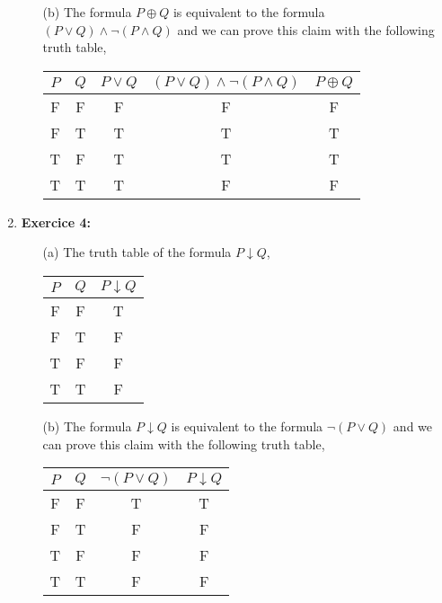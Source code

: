 \documentclass{article} %
\begin{document}
\begin{enumerate}
\begin{itemize}
        \item[(b)] The formula $P \oplus Q$ is equivalent to the formula $(P \lor Q) \land \neg (P \land Q)$ and we can prove this claim with the following truth table,
        \begin{center}
        \begin{tabular}{ccccc}
            $P$ & $Q$ & $P \lor Q$ & $(P \lor Q) \land \neg(P \land Q)$ & $P \oplus Q$ \\
            \hline
            F & F & F & F & F \\
            F & T & T & T & T \\
            T & F & T & T & T \\
            T & T & T & F & F \\
        \end{tabular}
        \end{center}

    \end{itemize}

    \item \textbf{Exercice 4:}
    \begin{itemize}
        \item[(a)] The truth table of the formula $P \downarrow Q$,
        \begin{center}
            \begin{tabular}{ccc}
                $P$ & $Q$ & $P \downarrow Q$ \\
                \hline
                F & F & T \\
                F & T & F \\
                T & F & F \\
                T & T & F \\
            \end{tabular}
        \end{center}

        \item[(b)] The formula $P \downarrow Q$ is equivalent to the formula $\neg (P \lor Q)$ and we can prove this claim with the following truth table,
        \begin{center}
            \begin{tabular}{cccc}
                $P$ & $Q$ & $\neg(P \lor Q)$ & $P \downarrow Q$ \\
                \hline
                F & F & T & T \\
                F & T & F & F \\
                T & F & F & F \\
                T & T & F & F \\
            \end{tabular}
        \end{center}


\end{itemize}
\end{enumerate}
\end{document}
